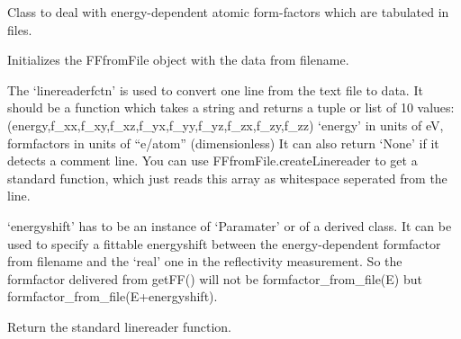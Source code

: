 \documentclass[letterpaper,10pt,english]{sphinxmanual}
\begin{document}
\begin{fulllineitems}
\label{\detokenize{modules-api/samplerepresentation:SampleRepresentation.FFfromFile}}
Class to deal with energy-dependent atomic form-factors which are tabulated in files.

\begin{fulllineitems}
\label{\detokenize{modules-api/samplerepresentation:SampleRepresentation.FFfromFile.__init__}}
Initializes the FFfromFile object with the data from filename.

The ‘linereaderfctn’ is used to convert one line from the text file to data.
It should be a function which takes a string and returns a tuple or list of 10 values: (energy,f\_xx,f\_xy,f\_xz,f\_yx,f\_yy,f\_yz,f\_zx,f\_zy,f\_zz) 
‘energy’ in units of eV, formfactors in units of “e/atom” (dimensionless)
It can also return ‘None’ if it detects a comment line.
You can use FFfromFile.createLinereader to get a standard function, which just reads this array as whitespace seperated from the line.

‘energyshift’ has to be an instance of ‘Paramater’ or of a derived class. It can be used to specify a fittable energyshift between
the energy-dependent formfactor from filename and the ‘real’ one in the reflectivity measurement. So the formfactor delivered from getFF() 
will not be formfactor\_from\_file(E) but formfactor\_from\_file(E+energyshift).

\end{fulllineitems}


\begin{fulllineitems}
\label{\detokenize{modules-api/samplerepresentation:SampleRepresentation.FFfromFile.createLinereader}}
Return the standard linereader function.


\end{fulllineitems}
\end{fulllineitems}
\end{document}
